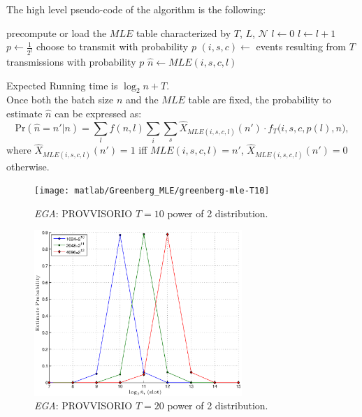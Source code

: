 \documentclass[11pt,a4paper,twoside,openright]{book}
\newcommand{\algname}[1]{\ensuremath{\mbox{\sc #1}}}
\begin{document}
The high level pseudo-code of the algorithm is the following: 
\begin{algorithm}[H]
\begin{algorithmic}
\STATE precompute or load the $MLE$ table characterized by $T$, $L$, $\mathcal{N}$
\STATE $l\gets 0$
\REPEAT
	\STATE $l\gets l+1$
	\STATE $p \gets {\displaystyle\frac{1}{2^{l}}}$
	\STATE choose to transmit with probability $p$
\STATE $(i,s,c) \gets$ events resulting from $T$ transmissions with probability $p$
\STATE $\hat{n}\gets MLE(i,s,c,l)$
\end{algorithmic}
\caption{\algname{EGA $(\mathcal{B},T,\mathcal{N})$}}
\label{alg-greenberg+MLE}
\end{algorithm}
Expected Running time is $\log_{2}n+T$.\\ 
Once both the batch size $n$ and the $MLE$ table are fixed, the probability to estimate $\hat{n}$ can be expressed as:
\begin{equation}
\textrm{Pr}(\hat{n}=n'|n)=\sum_{l}f(n,l)\sum_{i}\sum_{s} \hat{X}_{MLE(i,s,c,l)}(n') \cdot f_{T}\big(i,s,c,p(l),n\bigl),
\end{equation}
 where  $\hat{X}_{MLE(i,s,c,l)}(n')=1$ iff $MLE(i,s,c,l)=n'$,  $\hat{X}_{MLE(i,s,c,l)}(n')=0$ otherwise. \\

\begin{figure}[H]
\begin{center}
\texttt{[image: matlab/Greenberg\_MLE/greenberg-mle-T10]}
\caption{\emph{EGA}: PROVVISORIO $T=10$  power of 2 distribution.}
\end{center}
\end{figure}

\begin{figure}[H]
\begin{center}
\includegraphics[width=0.7\textwidth]{matlab/Greenberg_MLE/greenberg-mle-T20}
\caption{\emph{EGA}: PROVVISORIO $T=20$  power of 2 distribution.}
\end{center}
\end{figure}
\end{document}
